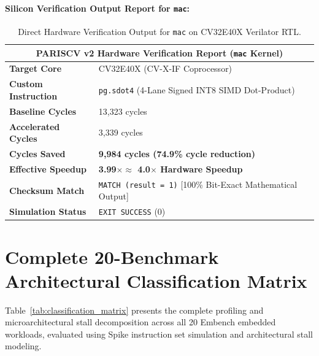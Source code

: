 \documentclass[11pt,a4paper]{article}
\begin{document}
\paragraph{Silicon Verification Output Report for \texttt{mac}:}
\begin{table}[h!]
\centering
\small
\begin{tabular}{|l l|}
\hline
\multicolumn{2}{|c|}{\textbf{PARISCV v2 Hardware Verification Report (\texttt{mac} Kernel)}} \\
\hline
\textbf{Target Core}        & CV32E40X (CV-X-IF Coprocessor) \\
\textbf{Custom Instruction} & \texttt{pg.sdot4} (4-Lane Signed INT8 SIMD Dot-Product) \\
\textbf{Baseline Cycles}    & 13,323 cycles \\
\textbf{Accelerated Cycles} & 3,339 cycles \\
\textbf{Cycles Saved}       & \textbf{9,984 cycles (74.9\% cycle reduction)} \\
\textbf{Effective Speedup}  & \textbf{3.99$\times \approx$ 4.0$\times$ Hardware Speedup} \\
\textbf{Checksum Match}     & \texttt{MATCH (result = 1)} [100\% Bit-Exact Mathematical Output] \\
\textbf{Simulation Status}  & \texttt{EXIT SUCCESS} (0) \\
\hline
\end{tabular}
\caption{Direct Hardware Verification Output for \texttt{mac} on CV32E40X Verilator RTL.}
\label{tab:flow_output}
\end{table}

\section{Complete 20-Benchmark Architectural Classification Matrix}

Table~\ref{tab:classification_matrix} presents the complete profiling and microarchitectural stall decomposition across all 20 Embench embedded workloads, evaluated using Spike instruction set simulation and architectural stall modeling.
\end{document}
